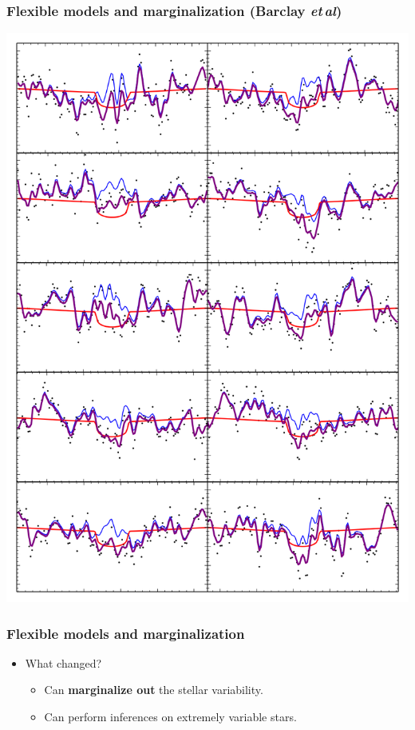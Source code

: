 \documentclass{beamer}
\newcommand{\foreign}[1]{\textsl{#1}}
\newcommand{\etal}{\foreign{et\,al}}
\renewcommand{\emph}[1]{\textbf{#1}}
\begin{document}
\begin{frame}
  \frametitle{Flexible models and marginalization \small{(Barclay \etal)}}
  \includegraphics[height=0.85\textheight]{ten_transits.png}
\end{frame}

\begin{frame}
  \frametitle{Flexible models and marginalization}
  \begin{itemize}
  \item What changed?
    \begin{itemize}
    \item Can \emph{marginalize out} the stellar variability.
    \item Can perform inferences on extremely variable stars.
    \end{itemize}
  \end{itemize}
\end{frame}
\end{document}
